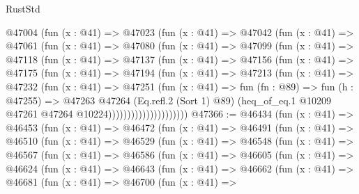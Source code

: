 \begin{lexlean}{RustStd}
\begin{coremodule}
              @47004
                (fun (x : @41) =>
                @47023
                  (fun (x : @41) =>
                  @47042
                    (fun (x : @41) =>
                    @47061
                      (fun (x : @41) =>
                      @47080
                        (fun (x : @41) =>
                        @47099
                          (fun (x : @41) =>
                          @47118
                            (fun (x : @41) =>
                            @47137
                              (fun (x : @41) =>
                              @47156
                                (fun (x : @41) =>
                                @47175
                                  (fun (x : @41) =>
                                  @47194
                                    (fun (x : @41) =>
                                    @47213
                                      (fun (x : @41) =>
                                      @47232
                                        (fun (x : @41) =>
                                        @47251
                                          (fun (x : @41) =>
                                          fun (fn : @89) =>
                                          fun (h : @47255) =>
                                          @47263
                                            @47264
                                            (Eq.refl.{2} (Sort 1) @89)
                                            (heq_of_eq.{1}
                                              @10209
                                              @47261
                                              @47264
                                              @10224)))))))))))))))))))))
@47366 := @46434
    (fun (x : @41) =>
    @46453
      (fun (x : @41) =>
      @46472
        (fun (x : @41) =>
        @46491
          (fun (x : @41) =>
          @46510
            (fun (x : @41) =>
            @46529
              (fun (x : @41) =>
              @46548
                (fun (x : @41) =>
                @46567
                  (fun (x : @41) =>
                  @46586
                    (fun (x : @41) =>
                    @46605
                      (fun (x : @41) =>
                      @46624
                        (fun (x : @41) =>
                        @46643
                          (fun (x : @41) =>
                          @46662
                            (fun (x : @41) =>
                            @46681
                              (fun (x : @41) =>
                              @46700
                                (fun (x : @41) =>

\end{coremodule}
\end{lexlean}
